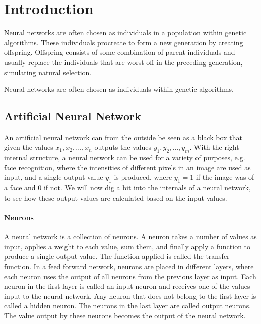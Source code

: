 \section{Introduction}
Neural networks are often chosen as individuals in a population within genetic algorithms. These individuals procreate to form a new generation by creating offspring. Offspring consists of some combination of parent individuals and usually replace the individuals that are worst off in the preceding generation, simulating natural selection.

Neural networks are often chosen as individuals within genetic algorithms.


\subsection{Artificial Neural Network}

An artificial neural network can from the outside be seen as a black box that 
given the values $x_1, x_2, ..., x_n$ outputs the values $y_1, y_2, ..., y_m$.
With the right internal structure, a neural network can be used for a variety of purposes, 
e.g. face recognition, where the intensities of different pixels in an image are used as input,
and a single output value $y_1$ is produced, where $y_1 = 1$ if the image was of a face and $0$ if not. 
We will now dig a bit into the internals of a neural network, to see how these output values are calculated based on the
input values.

\paragraph{Neurons}
A neural network is a collection of neurons. A neuron takes a number of values as input, applies
a weight to each value, sum them, and finally apply a function to produce a single output value. 
The function applied is called the transfer function.
In a feed forward network, neurons are placed in different layers, where each neuron uses the output of all
neurons from the previous layer as input. Each neuron in the first layer is called an input neuron and receives one
of the values input to the neural network. Any neuron that does not belong to the first layer is called a hidden neuron.
The neurons in the last layer are called output neurons. The value output by these neurons becomes
the output of the neural network.


